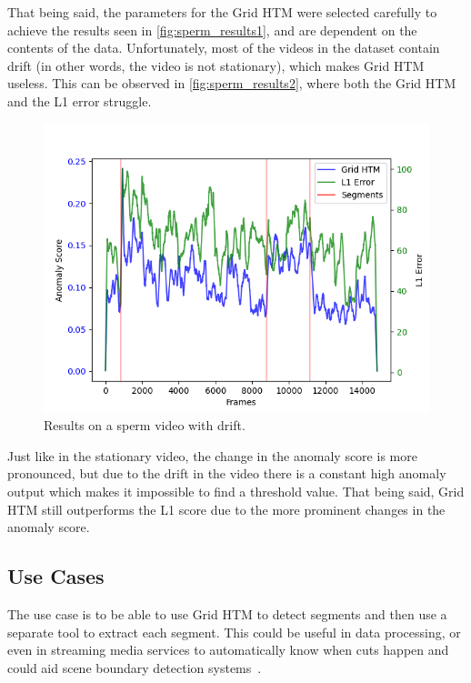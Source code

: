 \par
That being said, the parameters for the Grid HTM were selected carefully to achieve the results seen in \autoref{fig:sperm_results1}, and are dependent on the contents of the data. Unfortunately, most of the videos in the dataset contain drift (in other words, the video is not stationary), which makes Grid HTM useless. This can be observed in \autoref{fig:sperm_results2}, where both the Grid HTM and the L1 error struggle.
\begin{figure}[H]
    \centering
    \includegraphics[width=\textwidth]{resources/experiments/sperm/sperm_result2.png}
    \caption[Drifting Video Results]{Results on a sperm video with drift.}
    \label{fig:sperm_results2}
\end{figure}
Just like in the stationary video, the change in the anomaly score is more pronounced, but due to the drift in the video there is a constant high anomaly output which makes it impossible to find a threshold value. That being said, Grid HTM still outperforms the L1 score due to the more prominent changes in the anomaly score.
\subsection{Use Cases}
The use case is to be able to use Grid HTM to detect segments and then use a separate tool to extract each segment. This could be useful in data processing, or even in streaming media services to automatically know when cuts happen and could aid scene boundary detection systems~\cite{scene_boundary_detection}.

